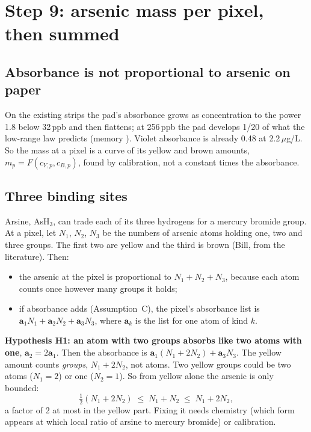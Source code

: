 \documentclass[11pt,letter]{article}
\newcommand{\file}[1]{\texttt{\seqsplit{#1}}}
\newcommand{\va}{\mathbf{a}}
\begin{document}
\section{Step 9: arsenic mass per pixel, then summed}
\label{sec:mass}

\subsection{Absorbance is not proportional to arsenic on paper}

On the existing strips the pad's absorbance grows as concentration to the
power 1.8 below 32\,ppb and then flattens; at 256\,ppb the pad develops
1/20 of what the low-range law predicts (memory
\file{project\_pad\_analysis\_findings}).  Violet absorbance is already
0.48 at 2.2\,$\mu$g/L.  So the mass at a pixel is a curve of its yellow and
brown amounts, $m_p = F(c_{Y,p}, c_{B,p})$, found by calibration, not a
constant times the absorbance.

\subsection{Three binding sites}

Arsine, AsH$_3$, can trade each of its three hydrogens for a mercury bromide
group.  At a pixel, let $N_1$, $N_2$, $N_3$ be the numbers of arsenic atoms
holding one, two and three groups.  The first two are yellow and the third
is brown (Bill, from the literature).  Then:
\begin{itemize}[nosep]
  \item the arsenic at the pixel is proportional to $N_1 + N_2 + N_3$,
    because each atom counts once however many groups it holds;
  \item if absorbance adds (Assumption~C), the pixel's absorbance list is
    $\va_1 N_1 + \va_2 N_2 + \va_3 N_3$, where $\va_k$ is the list for one
    atom of kind $k$.
\end{itemize}

\textbf{Hypothesis H1: an atom with two groups absorbs like two atoms with
one}, $\va_2 = 2\va_1$.  Then the absorbance is
$\va_1 (N_1 + 2N_2) + \va_3 N_3$.  The yellow amount counts
\emph{groups}, $N_1 + 2N_2$, not atoms.  Two yellow groups could be two
atoms ($N_1 = 2$) or one ($N_2 = 1$).  So from yellow alone the arsenic
is only bounded:
\begin{equation}
  \tfrac12 (N_1 + 2N_2) \;\le\; N_1 + N_2 \;\le\; N_1 + 2N_2 ,
\end{equation}
a factor of 2 at most in the yellow part.  Fixing it needs chemistry (which
form appears at which local ratio of arsine to mercury bromide) or
calibration.
\end{document}
